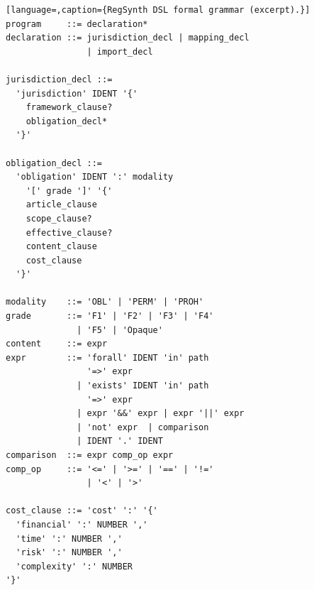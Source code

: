\documentclass[11pt,twocolumn]{article}
\begin{document}
\begin{lstlisting}[language=,caption={RegSynth DSL formal grammar (excerpt).}]
program     ::= declaration*
declaration ::= jurisdiction_decl | mapping_decl
                | import_decl

jurisdiction_decl ::=
  'jurisdiction' IDENT '{'
    framework_clause?
    obligation_decl*
  '}'

obligation_decl ::=
  'obligation' IDENT ':' modality
    '[' grade ']' '{'
    article_clause
    scope_clause?
    effective_clause?
    content_clause
    cost_clause
  '}'

modality    ::= 'OBL' | 'PERM' | 'PROH'
grade       ::= 'F1' | 'F2' | 'F3' | 'F4'
              | 'F5' | 'Opaque'
content     ::= expr
expr        ::= 'forall' IDENT 'in' path
                '=>' expr
              | 'exists' IDENT 'in' path
                '=>' expr
              | expr '&&' expr | expr '||' expr
              | 'not' expr  | comparison
              | IDENT '.' IDENT
comparison  ::= expr comp_op expr
comp_op     ::= '<=' | '>=' | '==' | '!='
                | '<' | '>'

cost_clause ::= 'cost' ':' '{'
  'financial' ':' NUMBER ','
  'time' ':' NUMBER ','
  'risk' ':' NUMBER ','
  'complexity' ':' NUMBER
'}'
\end{lstlisting}

\end{document}
